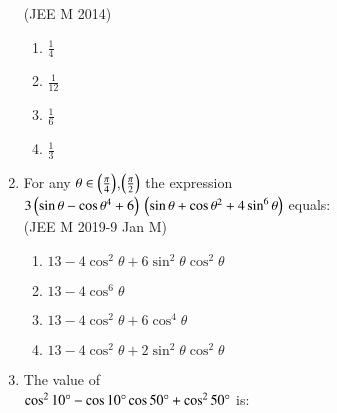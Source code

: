 \begin{enumerate}[label=\thesubsection.\arabic*,ref=\thesubsection.\theenumi]
\hfill {(JEE M 2014)}\\
    \begin{enumerate}
    \item  $\frac{1}{4}$ 
     \item $\frac{1}{12}$
    \item $\frac{1}{6}$
    \item $\frac{1}{3}$
    \end{enumerate}
  \item For any $\theta \in \left(\frac{\pi}{4}\right)$,$\left(\frac{\pi}{2}\right)$ the expression\\
 $3\left(\sin\theta-\cos\theta^4 +6\right)$ $\left(\sin\theta+\cos\theta^2 +4\sin^{6}\theta\right)$ equals:\\
 
\hfill {(JEE M 2019-9 Jan  M)}\\
 \begin{enumerate}
 \item $13-4\cos^2\theta +6\sin^2\theta \cos^2\theta $\\
 \item  $13-4\cos^6\theta$\\
\item  $13-4\cos^2\theta +6\cos^4\theta$\\
 \item $13-4\cos^2\theta +2\sin^2\theta \cos^2\theta$\\
 \end{enumerate}
\item The value of\\ $\cos^210\degree-\cos10\degree\cos50\degree+\cos^250\degree$ is:\\


\end{enumerate}
